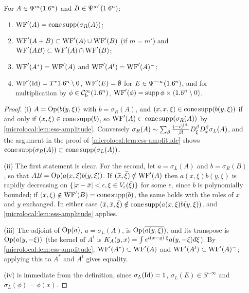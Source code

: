 \begin{proposition}\label{microlocal:prop:ess}
  For $A\in\Psi^{m}(1.6^n)$ and $B\in\Psi^{m'}(1.6^n)$:
  \begin{enumerate}[label=\textup{(\roman*)}]
  \item $\operatorname{WF}'(A)=\operatorname{cone\,supp}(\sigma_R(A))$;
  \item $\operatorname{WF}'(A+B)\subset\operatorname{WF}'(A)\cup\operatorname{WF}'(B)$ (if $m=m'$) and
    $\operatorname{WF}'(AB)\subset\operatorname{WF}'(A)\cap\operatorname{WF}'(B)$;
  \item $\operatorname{WF}'(A^*)=\operatorname{WF}'(A)$ and $\operatorname{WF}'(A^t)=\operatorname{WF}'(A)^-$;
  \item $\operatorname{WF}'(\operatorname{Id})=T^*1.6^n\setminus0$, $\operatorname{WF}'(E)=\emptyset$ for
    $E\in\Psi^{-\infty}(1.6^n)$, and for multiplication by $\phi\in\mathcal{C}^\infty_{\mathrm{b}}(1.6^n)$,
    $\operatorname{WF}'(\phi)=\operatorname{supp}\phi\times(1.6^n\setminus0)$.
  \end{enumerate}
\end{proposition}
\begin{proof}
  (i) $A=\operatorname{Op}(b(y,\xi))$ with $b=\sigma_R(A)$, and $(x,x,\xi)\in\operatorname{cone\,supp}(b(y,\xi))$
  if and only if $(x,\xi)\in\operatorname{cone\,supp}(b)$, so $\operatorname{WF}'(A)\subset\operatorname{cone\,supp}(\sigma_R(A))$
  by \cref{microlocal:lem:ess-amplitude}. Conversely
  $\sigma_R(A)\sim\sum_\beta\frac{(-i)^{\lvert \beta\rvert}}{\beta!}D^\beta_\xi
  D^\beta_x\sigma_L(A)$, and the argument in the proof of
  \cref{microlocal:lem:ess-amplitude} shows
  $\operatorname{cone\,supp}(\sigma_R(A))\subset\operatorname{cone\,supp}(\sigma_L(A))$.

  (ii) The first statement is clear. For the second, let $a=\sigma_L(A)$ and
  $b=\sigma_R(B)$, so that $AB=\operatorname{Op}(a(x,\xi)b(y,\xi))$. If $(\bar
  x,\bar\xi)\notin\operatorname{WF}'(A)$ then $a(x,\xi)b(y,\xi)$ is rapidly decreasing on
  $\{\lvert x-\bar x\rvert<\epsilon,\xi\in V_\epsilon(\bar\xi)\}$ for some $\epsilon$, since $b$
  is polynomially bounded; if $(\bar x,\bar\xi)\notin\operatorname{WF}'(B)=\operatorname{cone\,supp}(b)$,
  the same holds with the roles of $x$ and $y$ exchanged. In either case
  $(\bar x,\bar x,\bar\xi)\notin\operatorname{cone\,supp}(a(x,\xi)b(y,\xi))$, and
  \cref{microlocal:lem:ess-amplitude} applies.

  (iii) The adjoint of $\operatorname{Op}(a)$, $a=\sigma_L(A)$, is $\operatorname{Op}(\overline{a(y,\xi)})$,
  and its transpose is $\operatorname{Op}(a(y,-\xi))$ (the kernel of $A^t$ is
  $K_A(y,x)=\int e^{i(x-y)\cdot\xi}a(y,-\xi)\,\dbar\xi$). By
  \cref{microlocal:lem:ess-amplitude}, $\operatorname{WF}'(A^*)\subset\operatorname{WF}'(A)$ and
  $\operatorname{WF}'(A^t)\subset\operatorname{WF}'(A)^-$; applying this to $A^*$ and $A^t$ gives
  equality.

  (iv) is immediate from the definition, since $\sigma_L(\operatorname{Id})=1$,
  $\sigma_L(E)\in S^{-\infty}$ and $\sigma_L(\phi)=\phi(x)$.
\end{proof}

